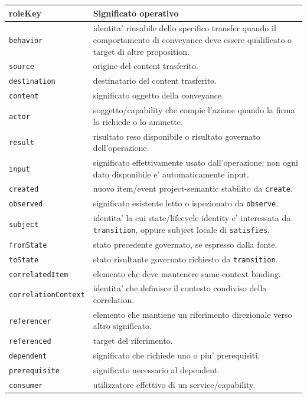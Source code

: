 \documentclass[11pt,a4paper]{article}
\begin{document}
\begin{longtable}{L{45mm}L{97mm}}
\toprule
\textbf{roleKey} & \textbf{Significato operativo} \\
\midrule\endhead
\texttt{behavior} & identita' riusabile dello specifico transfer quando il comportamento di conveyance deve essere qualificato o target di altre proposition. \\
\texttt{source} & origine del content trasferito. \\
\texttt{destination} & destinatario del content trasferito. \\
\texttt{content} & significato oggetto della conveyance. \\
\texttt{actor} & soggetto/capability che compie l'azione quando la firma lo richiede o lo ammette. \\
\texttt{result} & risultato reso disponibile o risultato governato dell'operazione. \\
\texttt{input} & significato effettivamente usato dall'operazione; non ogni dato disponibile e' automaticamente input. \\
\texttt{created} & nuovo item/event project-semantic stabilito da \texttt{create}. \\
\texttt{observed} & significato esistente letto o ispezionato da \texttt{observe}. \\
\texttt{subject} & identita' la cui state/lifecycle identity e' interessata da \texttt{transition}, oppure subject locale di \texttt{satisfies}. \\
\texttt{fromState} & stato precedente governato, se espresso dalla fonte. \\
\texttt{toState} & stato risultante governato richiesto da \texttt{transition}. \\
\texttt{correlatedItem} & elemento che deve mantenere same-context binding. \\
\texttt{correlationContext} & identita' che definisce il contesto condiviso della correlation. \\
\texttt{referencer} & elemento che mantiene un riferimento direzionale verso altro significato. \\
\texttt{referenced} & target del riferimento. \\
\texttt{dependent} & significato che richiede uno o piu' prerequisiti. \\
\texttt{prerequisite} & significato necessario al dependent. \\
\texttt{consumer} & utilizzatore effettivo di un service/capability. \\

\end{longtable}
\end{document}
